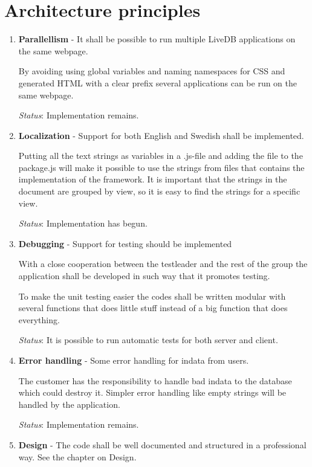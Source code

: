 \documentclass[a4paper, 12pt, titlepage]{article}
\begin{document}
\section{Architecture principles}
	\begin{enumerate}
	\cbstart
	\item \textbf{Parallellism} -
	It shall be possible to run multiple LiveDB applications on the same webpage.


	By avoiding using global variables and naming namespaces for CSS and generated HTML with a clear prefix several applications can be run on the same webpage.
	
	\textit{Status}: Implementation remains.


	\item  \textbf{Localization} -
	Support for both English and Swedish shall be implemented.
	

	Putting all the text strings as variables in a .js-file and adding the file to the package.js will make it possible to use the strings from files that contains the implementation of the framework. It is important that the strings in the document are grouped by view, so it is easy to find the strings for a specific view.
	
	\textit{Status}: Implementation has begun.

	
	\item  \textbf{Debugging} -
	Support for testing should be implemented

	With a close cooperation between the testleader and the rest of the group the application shall be developed in such way that it promotes testing.

	To make the unit testing easier the codes shall be written modular with several functions that does little stuff instead of a big function that does everything.

	
	\textit{Status}: It is possible to run automatic tests for both server and client.

	
	\item  \textbf{Error handling} -
	Some error handling for indata from users.

	The customer has the responsibility to handle bad indata to the database which could destroy it. Simpler error handling like empty strings will be handled by the application.
	
	\textit{Status}: Implementation remains.

	
	\item  \textbf{Design} -
	The code shall be well documented and structured in a professional way. See the chapter on Design.
	

\end{enumerate}
\end{document}
